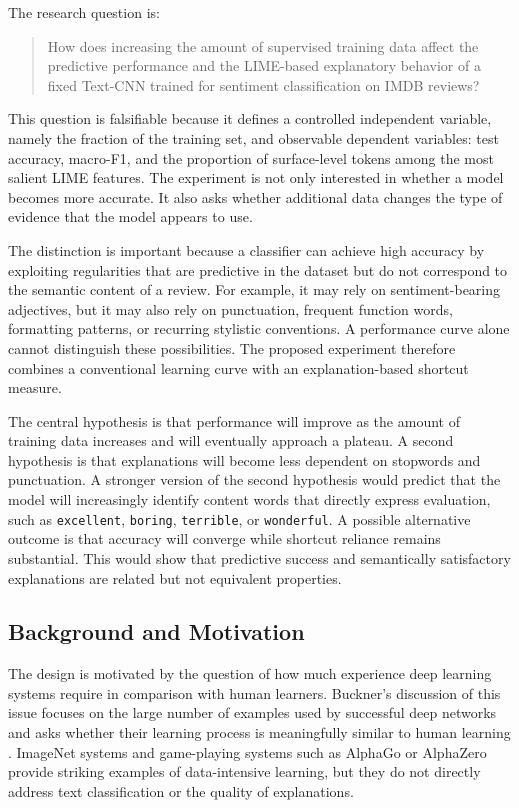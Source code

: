 \documentclass[11pt]{article}
\begin{document}
The research question is:

\begin{quote}
How does increasing the amount of supervised training data affect the predictive performance and the LIME-based explanatory behavior of a fixed Text-CNN trained for sentiment classification on IMDB reviews?
\end{quote}

This question is falsifiable because it defines a controlled independent variable, namely the fraction of the training set, and observable dependent variables: test accuracy, macro-F1, and the proportion of surface-level tokens among the most salient LIME features. The experiment is not only interested in whether a model becomes more accurate. It also asks whether additional data changes the type of evidence that the model appears to use.

The distinction is important because a classifier can achieve high accuracy by exploiting regularities that are predictive in the dataset but do not correspond to the semantic content of a review. For example, it may rely on sentiment-bearing adjectives, but it may also rely on punctuation, frequent function words, formatting patterns, or recurring stylistic conventions. A performance curve alone cannot distinguish these possibilities. The proposed experiment therefore combines a conventional learning curve with an explanation-based shortcut measure.

The central hypothesis is that performance will improve as the amount of training data increases and will eventually approach a plateau. A second hypothesis is that explanations will become less dependent on stopwords and punctuation. A stronger version of the second hypothesis would predict that the model will increasingly identify content words that directly express evaluation, such as \texttt{excellent}, \texttt{boring}, \texttt{terrible}, or \texttt{wonderful}. A possible alternative outcome is that accuracy will converge while shortcut reliance remains substantial. This would show that predictive success and semantically satisfactory explanations are related but not equivalent properties.

\subsection{Background and Motivation}

The design is motivated by the question of how much experience deep learning systems require in comparison with human learners. Buckner's discussion of this issue focuses on the large number of examples used by successful deep networks and asks whether their learning process is meaningfully similar to human learning \citep[Section 4.2]{buckner2019}. ImageNet systems and game-playing systems such as AlphaGo or AlphaZero provide striking examples of data-intensive learning, but they do not directly address text classification or the quality of explanations.
\end{document}
